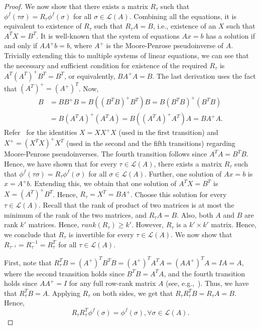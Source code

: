 \documentclass[10pt,letterpaper]{article}
\newcommand{\calL}{{\mathcal{L}}}
\newcommand{\rank}{{\calL(A)}}
\begin{document}
\begin{proof}
We now show that there exists a matrix $R_{\tau}$ such that $\phi^f(\tau \sigma) = R_{\tau} \phi^f(\sigma)$ for all $\sigma \in \rank$. Combining all the equations, it is equivalent to existence of $R_{\tau}$ such that $R_{\tau} A = B$, i.e., existence of an $X$ such that $A^T X = B^T$. It is well-known that the system of equations $Ax=b$ has a solution if and only if $AA^{+}b = b$, where $A^{+}$ is the Moore-Penrose pseudoinverse of $A$. Trivially extending this to multiple systems of linear equations, we can see that the necessary and sufficient condition for existence of the required $R_{\tau}$ is $A^T (A^T)^{+} B^T = B^T$, or equivalently, $B A^{+} A = B$. The last derivation uses the fact that $(A^T)^{+} = (A^{+})^T$. Now, 
\begin{align*}
B &= B B^{+} B = B \left( (B^T B)^{+} B^T \right) B = B (B^T B)^{+} \left( B^T B \right) \\
&= B (A^T A)^{+} \left( A^T A \right) = B \left( (A^T A)^{+} A^T \right) A = B A^{+} A.
\end{align*}
Refer~\cite{BH12} for the identities $X = X X^{+} X$ (used in the first transition) and $X^{+} = (X^T X)^{+} X^T$ (used in the second and the fifth transitions) regarding Moore-Penrose pseudoinverses. The fourth transition follows since $A^T A = B^T B$. Hence, we have shown that for every $\tau \in \rank$, there exists a matrix $R_{\tau}$ such that $\phi^f(\tau \sigma) = R_{\tau} \phi^f(\sigma)$ for all $\sigma \in \rank$. Further, one solution of $Ax=b$ is $x = A^{+}b$. Extending this, we obtain that one solution of $A^T X = B^T$ is $X = (A^T)^{+} B^T$. Hence, $R_{\tau} = X^T = BA^{+}$. Choose this solution for every $\tau \in \rank$. Recall that the rank of product of two matrices is at most the minimum of the rank of the two matrices, and $R_{\tau} A = B$. Also, both $A$ and $B$ are rank $k'$ matrices. Hence, $rank(R_{\tau}) \ge k'$. However, $R_{\tau}$ is a $k' \times k'$ matrix. Hence, we conclude that $R_{\tau}$ is invertible for every $\tau \in \rank$. We now show that $R_{\tau^{-1}} = R_{\tau}^{-1} = R_{\tau}^T$ for all $\tau \in \rank$. 

First, note that $R_{\tau}^T B = (A^{+})^T B^T B = (A^{+})^T A^T A = (A A^{+})^T A = I A = A$, where the second transition holds since $B^T B = A^T A$, and the fourth transition holds since $A A^{+} = I$ for any full row-rank matrix $A$ (see, e.g.,~\cite{BH12}). Thus, we have that $R_{\tau}^T B = A$. Applying $R_{\tau}$ on both sides, we get that $R_{\tau} R_{\tau}^T B = R_{\tau} A = B$. Hence, 
$$
R_{\tau} R_{\tau}^T \phi^f(\sigma) = \phi^f(\sigma), \forall \sigma \in \rank.
$$


\end{proof}
\end{document}
